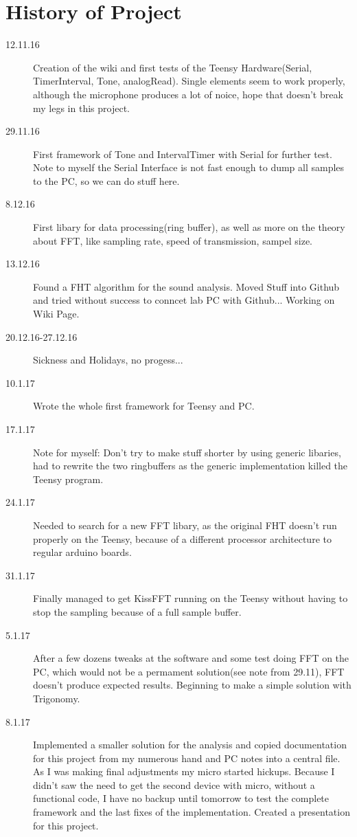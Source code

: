 \documentclass{book}
\begin{document}
\chapter{History of Project}
\begin{description}
\item[12.11.16]Creation of the wiki and first tests of the Teensy Hardware(Serial, TimerInterval, Tone, analogRead). Single elements seem to work properly, although the microphone produces a lot of noice, hope that doesn't break my legs in this project.
\item[29.11.16]First framework of Tone and IntervalTimer with Serial for further test. Note to myself the Serial Interface is not fast enough to dump all samples to the PC, so we can do stuff here.
\item[8.12.16]First libary for data processing(ring buffer), as well as more on the theory about FFT, like sampling rate, speed of transmission, sampel size.
\item[13.12.16]Found a FHT algorithm for the sound analysis. Moved Stuff into Github and tried without success to conncet lab PC with Github... Working on Wiki Page.
\item[20.12.16-27.12.16]Sickness and Holidays, no progess...
\item[10.1.17]Wrote the whole first framework for Teensy and PC.
\item[17.1.17] Note for myself: Don't try to make stuff shorter by using generic libaries, had to rewrite the two ringbuffers as the generic implementation killed the Teensy program.
\item[24.1.17]Needed to search for a new FFT libary, as the original FHT doesn't run properly on the Teensy, because of a different processor architecture to regular arduino boards.
\item[31.1.17]Finally managed to get KissFFT running on the Teensy without having to stop the sampling because of a full sample buffer.
\item[5.1.17]After a few dozens tweaks at the software and some test doing FFT on the PC, which would not be a permament solution(see note from 29.11), FFT doesn't produce expected results. Beginning to make a simple solution with Trigonomy.
\item[8.1.17]Implemented a smaller solution for the analysis and copied documentation for this project from my numerous hand and PC notes into a central file. As I was making final adjustments my micro started hickups. Because I didn't saw the need to get the second device with micro, without a functional code, I have no backup until tomorrow to test the complete framework and the last fixes of the implementation. Created a presentation for this project.
\end{description}
\end{document}

